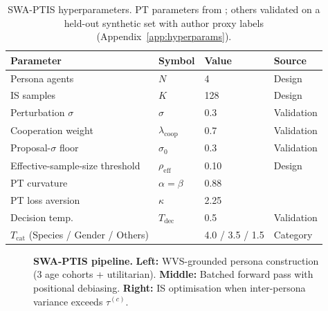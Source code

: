 \documentclass{article}
\begin{document}
\begin{table}[t]
\caption{SWA-PTIS hyperparameters. PT parameters from \citet{kahneman1979prospect};
others validated on a held-out synthetic set with author proxy labels
(Appendix~\ref{app:hyperparams}).}
\label{tab:hyperparams}
\centering\small
\begin{tabular}{llll}
\toprule
Parameter & Symbol & Value & Source \\
\midrule
Persona agents & $N$ & 4 & Design \\
IS samples & $K$ & 128 & Design \\
Perturbation $\sigma$ & $\sigma$ & 0.3 & Validation \\
Cooperation weight & $\lambda_{\text{coop}}$ & 0.7 & Validation \\
Proposal-$\sigma$ floor & $\sigma_0$ & 0.3 & Validation \\
Effective-sample-size threshold & $\rho_{\text{eff}}$ & 0.10 & Design \\
PT curvature & $\alpha{=}\beta$ & 0.88 & \citet{kahneman1979prospect} \\
PT loss aversion & $\kappa$ & 2.25 & \citet{kahneman1979prospect} \\
Decision temp. & $T_{\text{dec}}$ & 0.5 & Validation \\
$T_{\text{cat}}$ (Species / Gender / Others) & & 4.0 / 3.5 / 1.5 & Category \\
\bottomrule
\end{tabular}
\end{table}

\begin{figure}[t]
  \centering
  \caption{%
    \textbf{SWA-PTIS pipeline.}
    \textbf{Left:} WVS-grounded persona construction (3 age cohorts + utilitarian).
    \textbf{Middle:} Batched forward pass with positional debiasing.
    \textbf{Right:} IS optimisation when inter-persona variance exceeds $\tau^{(c)}$.
  }
  \label{fig:overview}
\end{figure}

\end{document}
